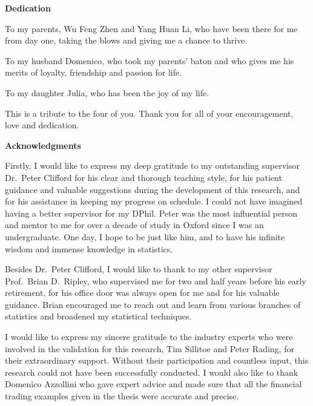 \documentclass[12pt,a4paper,oneside,titlepage]{book}
\begin{document}
\begin{onehalfspace}
\begin{center}
\textbf{Dedication}
\vspace{1em}
\end{center}

To my parents, Wu Feng Zhen and Yang Huan Li, who have been there for me from day one, taking the blows and giving me a chance to thrive.

\vspace{1em}
To my husband Domenico, who took my parents' baton and who gives me his merits of loyalty, friendship and passion for life.



\vspace{1em}
To my daughter Julia, who has been the joy of my life.

\vspace{1em}
This is a tribute to the four of you. Thank you for all of your encouragement, love and dedication.



\newpage
\thispagestyle{plain}
\begin{center}
\textbf{Acknowledgments}
\vspace{1em}
\end{center}

Firstly, I would like to express my deep gratitude to my outstanding supervisor Dr.\ Peter Clifford for his clear and thorough teaching style, for his patient guidance and valuable suggestions during the development of this research, and for his assistance in keeping my progress on schedule. I could not have imagined having a better supervisor for my DPhil. Peter was the most influential person and mentor to me for over a decade of study in Oxford since I was an undergraduate. One day, I hope to be just like him, and to have his infinite wisdom and immense knowledge in statistics.


Besides Dr.\ Peter Clifford, I would like to thank to my other supervisor Prof.\ Brian D.\ Ripley, who supervised me for two and half years before his early retirement, for his office door was always open for me and for his valuable guidance. Brian encouraged me to reach out and learn from various branches of statistics and broadened my statistical techniques.

I would like to express my sincere gratitude to the industry experts who were involved in the validation for this research, Tim Sillitoe and Peter Rading, for their extraordinary support. Without their participation and countless input, this research could not have been successfully conducted. I would also like to thank Domenico Azzollini who gave expert advice and made sure that all the financial trading examples given in the thesis were accurate and precise. 


\end{onehalfspace}
\end{document}
